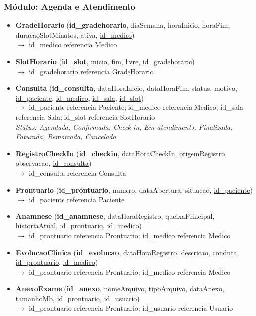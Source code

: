 \subsubsection{Módulo: Agenda e Atendimento}
\begin{itemize}[itemsep=10pt]

    \item \textbf{GradeHorario} (\textbf{id\_gradehorario}, diaSemana, horaInicio, horaFim, duracaoSlotMinutos, ativa, \underline{id\_medico})
    \\{\small $\rightarrow$ id\_medico referencia Medico}

    \item \textbf{SlotHorario} (\textbf{id\_slot}, inicio, fim, livre, \underline{id\_gradehorario})
    \\{\small $\rightarrow$ id\_gradehorario referencia GradeHorario}

    \item \textbf{Consulta} (\textbf{id\_consulta}, dataHoraInicio, dataHoraFim, status, motivo, \underline{id\_paciente}, \underline{id\_medico}, \underline{id\_sala}, \underline{id\_slot})
    \\{\small $\rightarrow$ id\_paciente referencia Paciente; id\_medico referencia Medico; id\_sala referencia Sala; id\_slot referencia SlotHorario}
    \\{\small \textit{Status: Agendada, Confirmada, Check-in, Em atendimento, Finalizada, Faturada, Remarcada, Cancelada}}

    \item \textbf{RegistroCheckIn} (\textbf{id\_checkin}, dataHoraCheckIn, origemRegistro, observacao, \underline{id\_consulta})
    \\{\small $\rightarrow$ id\_consulta referencia Consulta}


    \item \textbf{Prontuario} (\textbf{id\_prontuario}, numero, dataAbertura, situacao, \underline{id\_paciente})
    \\{\small $\rightarrow$ id\_paciente referencia Paciente}


    \item \textbf{Anamnese} (\textbf{id\_anamnese}, dataHoraRegistro, queixaPrincipal, historiaAtual, \underline{id\_prontuario}, \underline{id\_medico})
    \\{\small $\rightarrow$ id\_prontuario referencia Prontuario; id\_medico referencia Medico}


    \item \textbf{EvolucaoClinica} (\textbf{id\_evolucao}, dataHoraRegistro, descricao, conduta, \underline{id\_prontuario}, \underline{id\_medico})
    \\{\small $\rightarrow$ id\_prontuario referencia Prontuario; id\_medico referencia Medico}


    \item \textbf{AnexoExame} (\textbf{id\_anexo}, nomeArquivo, tipoArquivo, dataAnexo, tamanhoMb, \underline{id\_prontuario}, \underline{id\_usuario})
    \\{\small $\rightarrow$ id\_prontuario referencia Prontuario; id\_usuario referencia Usuario}


\end{itemize}

